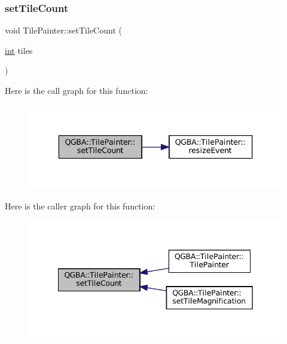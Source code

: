 \mbox{\label{class_q_g_b_a_1_1_tile_painter_a7c4854ea34e6557d307a8bcc80c25bc9}} 
\subsubsection{\texorpdfstring{set\+Tile\+Count}{setTileCount}}
{\footnotesize\ttfamily void Tile\+Painter\+::set\+Tile\+Count (\begin{DoxyParamCaption}\item[{\mbox{\hyperlink{ioapi_8h_a787fa3cf048117ba7123753c1e74fcd6}{int}}}]{tiles }\end{DoxyParamCaption})\hspace{0.3cm}{\ttfamily [slot]}}

Here is the call graph for this function\+:
\nopagebreak
\begin{figure}[H]
\begin{center}
\leavevmode
\includegraphics[width=336pt]{class_q_g_b_a_1_1_tile_painter_a7c4854ea34e6557d307a8bcc80c25bc9_cgraph}
\end{center}
\end{figure}
Here is the caller graph for this function\+:
\nopagebreak
\begin{figure}[H]
\begin{center}
\leavevmode
\includegraphics[width=342pt]{class_q_g_b_a_1_1_tile_painter_a7c4854ea34e6557d307a8bcc80c25bc9_icgraph}
\end{center}
\end{figure}
\mbox{\label{class_q_g_b_a_1_1_tile_painter_ac9e24d354a3f591c46cd74febeabd682}} 
